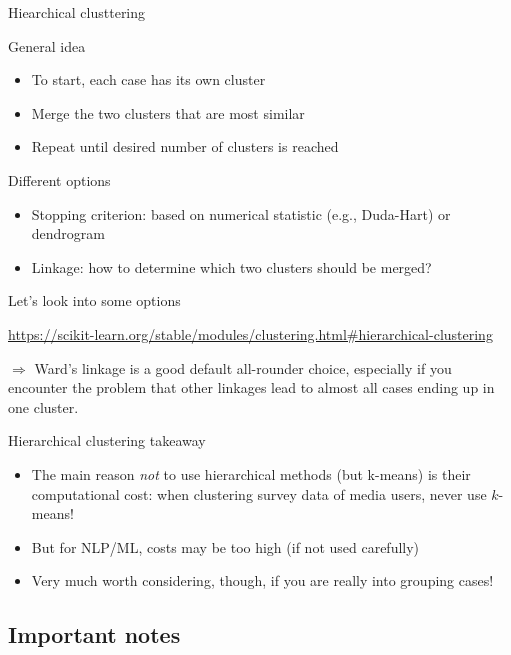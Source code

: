\begin{frame}{Hiearchical clusttering}
\begin{block}{General idea}
\begin{itemize}
\item To start, each case has its own cluster
\item Merge the two clusters that are most similar
\item Repeat until desired number of clusters is reached
\end{itemize}

\end{block}

\pause

\begin{block}{Different options}
\begin{itemize}
\item Stopping criterion: based on numerical statistic (e.g., Duda-Hart) or dendrogram
\item Linkage: how to determine which two clusters should be merged?
\end{itemize}

\end{block}
\end{frame}


\begin{frame}{Let's look into some options}

\url{https://scikit-learn.org/stable/modules/clustering.html\#hierarchical-clustering}

$\Rightarrow$ Ward's linkage is a good default all-rounder choice, especially if you encounter the problem that other linkages lead to almost all cases ending up in one cluster. 
\end{frame}


\begin{frame}{Hierarchical clustering takeaway}
\begin{itemize}
\item The main reason \emph{not} to use hierarchical methods (but k-means) is their computational cost: when clustering survey data of media users, never use $k$-means!
\item But for NLP/ML, costs may be too high (if not used carefully)
\item Very much worth considering, though, if you are really into grouping cases!
\end{itemize}
\end{frame}


\subsection{Important notes}

